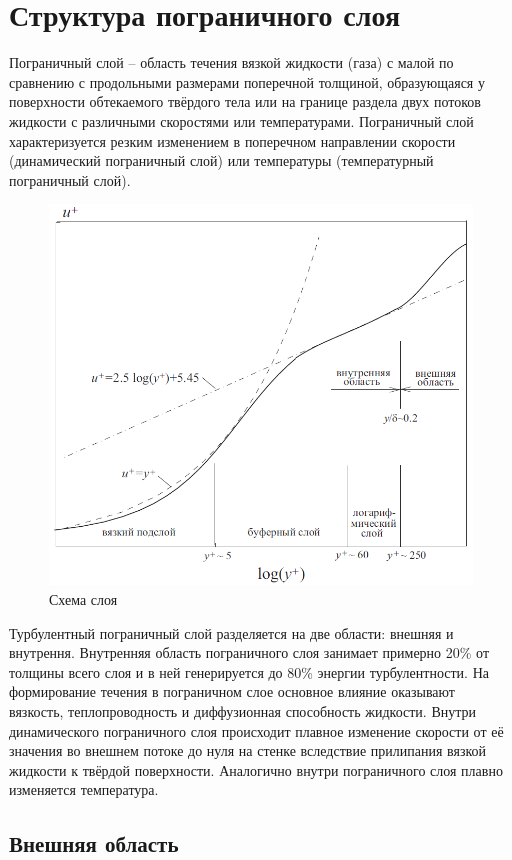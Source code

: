 \section{Структура пограничного слоя}
	Пограничный слой -- область течения вязкой жидкости (газа) с малой по сравнению с продольными размерами поперечной толщиной, образующаяся у поверхности обтекаемого твёрдого тела или на границе раздела двух потоков жидкости с различными скоростями или температурами. Пограничный слой характеризуется резким изменением в поперечном направлении скорости (динамический пограничный слой) или температуры (температурный пограничный слой).
	
	\begin{figure}[H]
		\centering
		\includegraphics[width=0.7\linewidth]{../Assets/ПогранСлой}
		\caption{Схема слоя}
	\end{figure}
	Турбулентный пограничный слой разделяется на две области: внешняя и внутрення. Внутренняя область пограничного слоя занимает примерно 20\% от толщины всего слоя и в ней генерируется до 80\% энергии турбулентности. На формирование течения в пограничном слое основное влияние оказывают вязкость, теплопроводность и диффузионная способность жидкости. Внутри динамического пограничного слоя происходит плавное изменение скорости от её значения во внешнем потоке до нуля на стенке вследствие прилипания вязкой жидкости к твёрдой поверхности. Аналогично внутри 	пограничного слоя плавно изменяется температура.\\		

\subsection{Внешняя область}

